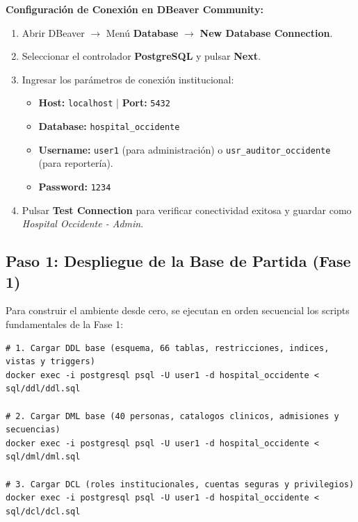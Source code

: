 \documentclass[11pt,a4paper]{article}
\begin{document}
\textbf{Configuración de Conexión en DBeaver Community:}
\begin{enumerate}
	\item Abrir DBeaver $\to$ Menú \textbf{Database} $\to$ \textbf{New Database Connection}.
	\item Seleccionar el controlador \textbf{PostgreSQL} y pulsar \textbf{Next}.
	\item Ingresar los parámetros de conexión institucional:
	\begin{itemize}
		\item \textbf{Host:} \texttt{localhost} \quad | \quad \textbf{Port:} \texttt{5432}
		\item \textbf{Database:} \texttt{hospital\_occidente}
		\item \textbf{Username:} \texttt{user1} (para administración) o \texttt{usr\_auditor\_occidente} (para reportería).
		\item \textbf{Password:} \texttt{1234}
	\end{itemize}
	\item Pulsar \textbf{Test Connection} para verificar conectividad exitosa y guardar como \textit{Hospital Occidente - Admin}.
\end{enumerate}

\subsection{Paso 1: Despliegue de la Base de Partida (Fase 1)}
Para construir el ambiente desde cero, se ejecutan en orden secuencial los scripts fundamentales de la Fase 1:
\begin{lstlisting}[style=sqlstyle]
# 1. Cargar DDL base (esquema, 66 tablas, restricciones, indices, vistas y triggers)
docker exec -i postgresql psql -U user1 -d hospital_occidente < sql/ddl/ddl.sql

# 2. Cargar DML base (40 personas, catalogos clinicos, admisiones y secuencias)
docker exec -i postgresql psql -U user1 -d hospital_occidente < sql/dml/dml.sql

# 3. Cargar DCL (roles institucionales, cuentas seguras y privilegios)
docker exec -i postgresql psql -U user1 -d hospital_occidente < sql/dcl/dcl.sql
\end{lstlisting}
\end{document}
